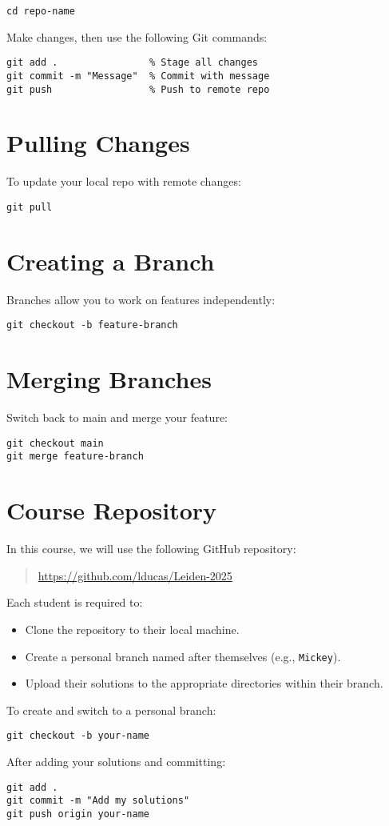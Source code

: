 \documentclass[11pt]{article}
\begin{document}
\begin{lstlisting}
cd repo-name
\end{lstlisting}

\noindent Make changes, then use the following Git commands:

\begin{lstlisting}
git add .                % Stage all changes
git commit -m "Message"  % Commit with message
git push                 % Push to remote repo
\end{lstlisting}

\section{Pulling Changes}
To update your local repo with remote changes:

\begin{lstlisting}
git pull
\end{lstlisting}

\section{Creating a Branch}
Branches allow you to work on features independently:

\begin{lstlisting}
git checkout -b feature-branch
\end{lstlisting}

\section{Merging Branches}
Switch back to main and merge your feature:

\begin{lstlisting}
git checkout main
git merge feature-branch
\end{lstlisting}

\section{Course Repository}
In this course, we will use the following GitHub repository:

\begin{quote}
\url{https://github.com/lducas/Leiden-2025}
\end{quote}

\noindent Each student is required to:

\begin{itemize}
    \item Clone the repository to their local machine.
    \item Create a personal branch named after themselves (e.g., \texttt{Mickey}).
    \item Upload their solutions to the appropriate directories within their branch.
\end{itemize}

\noindent To create and switch to a personal branch:

\begin{lstlisting}
git checkout -b your-name
\end{lstlisting}

\noindent After adding your solutions and committing:

\begin{lstlisting}
git add .
git commit -m "Add my solutions"
git push origin your-name
\end{lstlisting}
\end{document}
